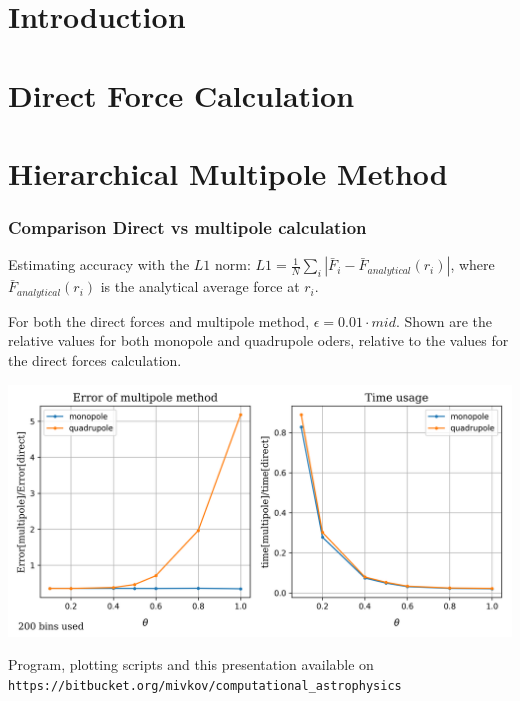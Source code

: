 \begin{frame}{}
	\titlepage
\end{frame}

\section{Introduction}



\section{Direct Force Calculation}



\section{Hierarchical Multipole Method}




\begin{frame}
	\frametitle{Comparison Direct vs multipole calculation}
	
	Estimating accuracy with the $L1$ norm: $L1 = \frac{1}{N} \sum\limits_i |\bar{F}_i - \bar{F}_{analytical}(r_i)|$, where $\bar{F}_{analytical}(r_i)$  is the analytical average force at $r_i$.
	
	For both the direct forces and multipole method, $\epsilon = 0.01 \cdot mid$. Shown are the relative values for both monopole and quadrupole oders, relative to the values for the direct forces calculation.
	
	\centering
	\includegraphics[width=.9\textwidth]{../results/multipole_forces/compare_direct_multipole.png}
\end{frame}






\begin{frame}[fragile]
	Program, plotting scripts and this presentation available on \verb!https://bitbucket.org/mivkov/computational_astrophysics!
\end{frame}









